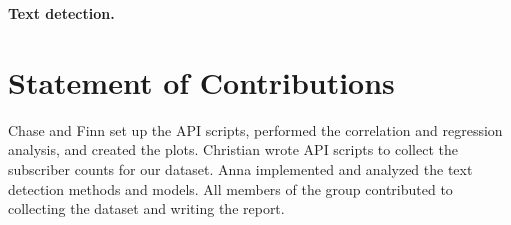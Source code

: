 \documentclass{article}
\begin{document}
\textbf{Text detection.}

\section{Statement of Contributions}


Chase and Finn set up the API scripts, performed the correlation and regression analysis, and created the plots. Christian wrote API scripts to collect the subscriber counts for our dataset. Anna implemented and analyzed the text detection methods and models. All members of the group contributed to collecting the dataset and writing the report.




\end{document}
